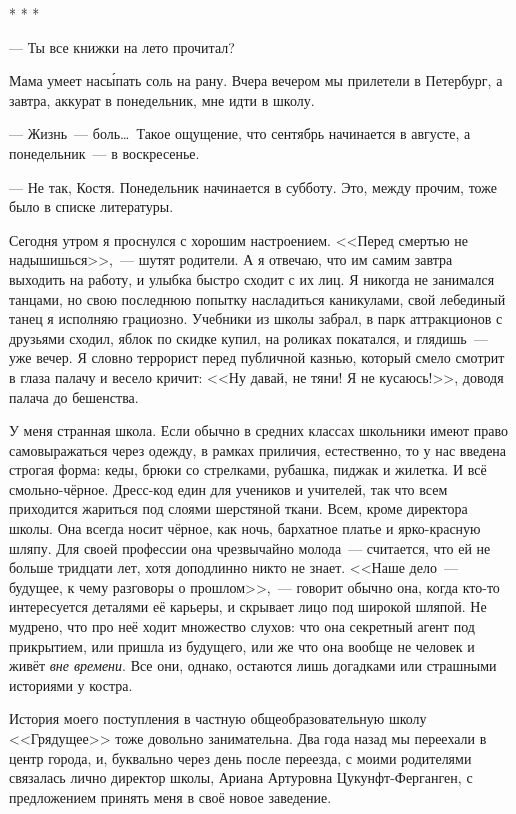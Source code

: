 \documentclass[openany, oneside]{book}
\begin{document}
\begin{center}
    * * *
\end{center}

--- Ты все книжки на лето прочитал?

Мама умеет нас\'{ы}пать соль на рану. Вчера вечером мы прилетели в Петербург, а завтра, аккурат в понедельник, мне идти в школу.

--- Жизнь~--- боль\dots \ Такое ощущение, что сентябрь начинается в августе, а понедельник~--- в воскресенье.

--- Не так, Костя. Понедельник начинается в субботу. Это, между прочим, тоже было в списке литературы.

Сегодня утром я проснулся с хорошим настроением. <<Перед смертью не надышишься>>,~--- шутят родители. А я отвечаю, что им самим завтра выходить на работу, и улыбка быстро сходит с их лиц. Я никогда не занимался танцами, но свою последнюю попытку насладиться каникулами, свой лебединый танец я исполняю грациозно. Учебники из школы забрал, в парк аттракционов с друзьями сходил, яблок по скидке купил, на роликах покатался, и глядишь~--- уже вечер. Я словно террорист перед публичной казнью, который смело смотрит в глаза палачу и весело кричит: <<Ну давай, не тяни! Я не кусаюсь!>>, доводя палача до бешенства.

У меня странная школа. Если обычно в средних классах школьники имеют право самовыражаться через одежду, в рамках приличия, естественно, то у нас введена строгая форма: кеды, брюки со стрелками, рубашка, пиджак и жилетка. И всё смольно-чёрное. Дресс-код един для учеников и учителей, так что всем приходится жариться под слоями шерстяной ткани. Всем, кроме директора школы. Она всегда носит чёрное, как ночь, бархатное платье и ярко-красную шляпу. Для своей профессии она чрезвычайно молода~--- считается, что ей не больше тридцати лет, хотя доподлинно никто не знает. <<Наше дело~--- будущее, к чему разговоры о прошлом>>,~--- говорит обычно она, когда кто-то интересуется деталями её карьеры, и скрывает лицо под широкой шляпой. Не мудрено, что про неё ходит множество слухов: что она секретный агент под прикрытием, или пришла из будущего, или же что она вообще не человек и живёт \textit{вне времени}. Все они, однако, остаются лишь догадками или страшными историями у костра.

История моего поступления в частную общеобразовательную школу <<Грядущее>> тоже довольно занимательна. Два года назад мы переехали в центр города, и, буквально через день после переезда, с моими родителями связалась лично директор школы, Ариана Артуровна Цукунфт-Ферганген, с предложением принять меня в своё новое заведение.
\end{document}
